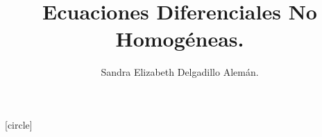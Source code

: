 
\title{Ecuaciones Diferenciales No Homogéneas.}
\author{Sandra Elizabeth Delgadillo Alemán.}

\usepackage{arev} %
\usepackage{cancel}
[circle] %

\newcommand{\dis}{\displaystyle} 
\newcommand\Myref[1]{
  \begingroup
  \usebeamerfont*{item projected}%
  \usebeamercolor[bg]{item projected}%
  \begin{pgfpicture}{-1ex}{0ex}{1ex}{2ex}
    \pgfpathcircle{\pgfpoint{0pt}{.75ex}}{1.2ex}
    \pgfusepath{fill}
    \pgftext[base]{\color{fg}\ref{#1}}
  \end{pgfpicture}%
  \endgroup
}
